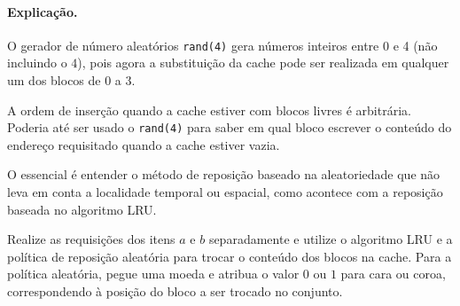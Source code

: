 \paragraph{Explicação.}O gerador de número aleatórios {\tt rand(4)} gera números inteiros
entre 0 e 4 (não incluindo o $4$), pois agora a substituição da
cache pode ser realizada em qualquer um dos blocos de $0$ a $3$. 

A ordem de inserção quando a cache estiver com blocos livres é
arbitrária. Poderia até ser usado o {\tt rand(4)} para saber em qual
bloco escrever o conteúdo do endereço requisitado quando a cache
estiver vazia.

O essencial é entender o método de reposição baseado na aleatoriedade
que não leva em conta a localidade temporal ou espacial, como acontece
com a reposição baseada no algoritmo LRU.


Realize as requisições dos itens $a$ e $b$ separadamente e utilize o
algoritmo LRU e a política de reposição aleatória para trocar o
conteúdo dos blocos na cache. Para a política aleatória, pegue uma
moeda e atribua o valor $0$ ou $1$ para cara ou coroa, correspondendo
à posição do bloco a ser trocado no conjunto.

